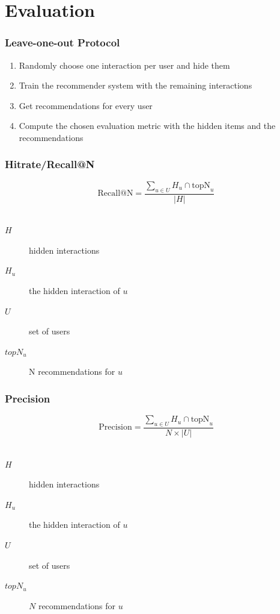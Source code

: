\documentclass[mathserif,svgnames]{beamer}
\begin{document}
\section{Evaluation}
\begin{frame}
    \frametitle{Leave-one-out Protocol}
    \begin{enumerate}
        \item Randomly choose one interaction per user and hide them
        \item Train the recommender system with the remaining interactions
        \item Get recommendations for every user
        \item Compute the chosen evaluation metric with the hidden items and the recommendations
    \end{enumerate}

\end{frame}
\begin{frame} 
\frametitle{Hitrate/Recall@N~\cite{Karypis:2001:EIT:502585.502627, Sarwar00applicationof}}
\begin{equation} 
\text{Recall@N}=\frac{\sum_{u \in U} H_u \cap \text{topN}_u}{|H|}
\end{equation}\\
\vspace{6.4mm}
\begin{description}
    \item[$H$] hidden interactions\\
    \item[$H_u$] the hidden interaction of $u$\\
    \item[$U$] set of users
    \item[$topN_u$] N recommendations for $u$
\end{description}
\end{frame}

\begin{frame} 
\frametitle{Precision~\cite{Sarwar00applicationof}}
\begin{equation} 
\text{Precision}=\frac{\sum_{u \in U} H_u \cap \text{topN}_u}{N \times |U|}
\end{equation}\\
\vspace{6.4mm}
\begin{description}
    \item[$H$] hidden interactions\\
    \item[$H_u$] the hidden interaction of $u$\\
    \item[$U$] set of users
    \item[$topN_u$] $N$ recommendations for $u$
\end{description}
\end{frame}
\end{document}

